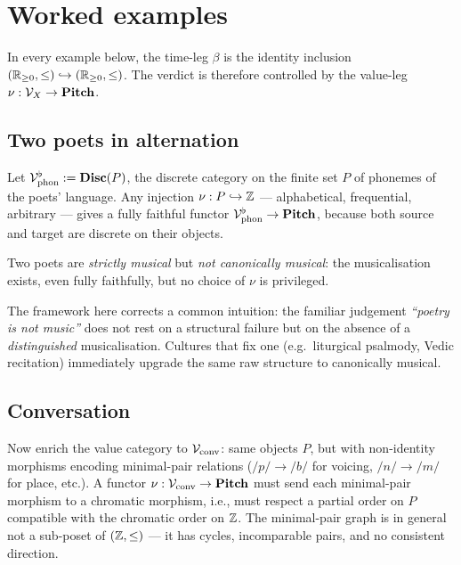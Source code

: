 \section{Worked examples}

In every example below, the time-leg $\beta$ is the identity
inclusion $(\mathbb{R}_{\geq 0}, \leq) \hookrightarrow (\mathbb{R}_{\geq 0}, \leq)$.
The verdict is therefore controlled by the value-leg
$\nu : \mathcal{V}_X \to \mathbf{Pitch}$.

\subsection{Two poets in alternation}
Let $\mathcal{V}_{\mathrm{phon}}^\flat := \mathbf{Disc}(P)$, the discrete category on
the finite set $P$ of phonemes of the poets' language. Any injection
$\nu : P \hookrightarrow \mathbb{Z}$ — alphabetical, frequential, arbitrary
— gives a fully faithful functor $\mathcal{V}_{\mathrm{phon}}^\flat \to \mathbf{Pitch}$,
because both source and target are discrete on their objects.

\begin{verdict}
Two poets are \emph{strictly musical} but \emph{not canonically
musical}: the musicalisation exists, even fully faithfully, but no
choice of $\nu$ is privileged.
\end{verdict}

\noindent The framework here corrects a common intuition: the
familiar judgement \emph{``poetry is not music''} does not rest on a
structural failure but on the absence of a \emph{distinguished}
musicalisation. Cultures that fix one (e.g.\ liturgical psalmody, Vedic
recitation) immediately upgrade the same raw structure to canonically
musical.

\subsection{Conversation}
Now enrich the value category to $\mathcal{V}_{\mathrm{conv}}$: same objects $P$,
but with non-identity morphisms encoding minimal-pair relations
($/p/ \to /b/$ for voicing, $/n/ \to /m/$ for place, etc.). A functor
$\nu : \mathcal{V}_{\mathrm{conv}} \to \mathbf{Pitch}$ must send each minimal-pair
morphism to a chromatic morphism, i.e., must respect a partial order
on $P$ compatible with the chromatic order on $\mathbb{Z}$. The minimal-pair
graph is in general not a sub-poset of $(\mathbb{Z}, \leq)$ — it has cycles,
incomparable pairs, and no consistent direction.

